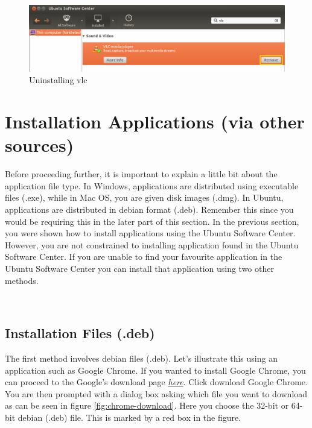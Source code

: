 \begin{figure}[h!]	
	\centering
	\includegraphics[width=325pt]{./images/applications/uninstall-vlc.png}
	\caption{Uninstalling vlc}	
	\label{fig:uninstall-vlc}		
\end{figure}

\section{Installation Applications (via other sources)}
Before proceeding further, it is important to explain a little bit about the application file type. In Windows, applications are distributed using executable files (.exe), while in Mac OS, you are given disk images (.dmg). In Ubuntu, applications are distributed in debian format (.deb). Remember this since you would be requiring this in the later part of this section. In the previous section, you were shown how to install applications using the Ubuntu Software Center. However, you are not constrained to installing application found in the Ubuntu Software Center. If you are unable to find your favourite application in the Ubuntu Software Center you can install that application using two other methods. \\

\par \noindent {} \\

\subsection*{Installation Files (.deb)} 

The first method involves debian files (.deb). Let's illustrate this using an application such as Google Chrome. If you wanted to install Google Chrome, you can proceed to the Google's download page  \href{https://www.google.com/chrome}{\textit{here}}. Click download Google Chrome. You are then prompted with a dialog box asking which file you want to download as can be seen in figure \ref{fig:chrome-download}. Here you choose the 32-bit or 64-bit debian (.deb) file. This is marked by a red box in the figure.

